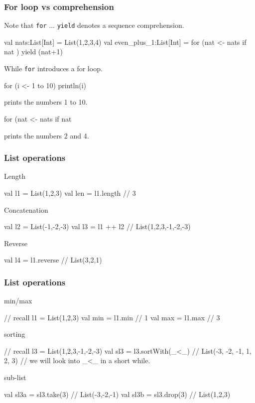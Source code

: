 \documentclass{beamer}
\newcommand{\beb}{\begin{exampleblock}}
\newcommand{\eeb}{\end{exampleblock}}
\begin{document}

\begin{frame}[fragile]
\frametitle{For loop vs comprehension}
Note that {\tt for} ... {\tt yield} denotes a sequence comprehension. 
\beb{}
\begin{code}
val nats:List[Int] = List(1,2,3,4)
val even_plus_1:List[Int] = for (nat <- nats
                                 if nat %
                                ) yield (nat+1)
\end{code}
\eeb
While {\tt for} introduces a for loop.
\beb{}
\begin{code}
for (i <- 1 to 10) { println(i) }
\end{code}
\eeb
%
prints the numbers 1 to 10.
\beb{}
\begin{code}
for (nat <- nats if nat %
\end{code}
%
\eeb
prints the numbers 2 and 4.
\end{frame}



\begin{frame}[fragile]
\frametitle{List operations}
\beb{Length}
\begin{code}
val l1 = List(1,2,3)
val len = l1.length // 3
\end{code}
\eeb
\beb{Concatenation}
\begin{code}
val l2 = List(-1,-2,-3)
val l3 = l1 ++ l2 // List(1,2,3,-1,-2,-3)
\end{code}
\eeb
\beb{Reverse}
\begin{code}
val l4 = l1.reverse // List(3,2,1)
\end{code}
\eeb
\end{frame}


\begin{frame}[fragile]
\frametitle{List operations}
\beb{min/max}
\begin{code}
// recall l1 = List(1,2,3)
val min = l1.min // 1
val max = l1.max // 3
\end{code}
\eeb
\beb{sorting}
\begin{code}
// recall l3 = List(1,2,3,-1,-2,-3)
val sl3 = l3.sortWith(_<_) // List(-3, -2, -1, 1, 2, 3)
// we will look into _<_ in a short while.
\end{code}
\eeb
\beb{sub-list}
\begin{code}
val sl3a = sl3.take(3) // List(-3,-2,-1)
val sl3b = sl3.drop(3) // List(1,2,3)
\end{code}
\eeb
\end{frame}
\end{document}
